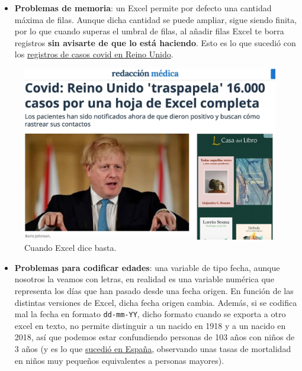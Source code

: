 \documentclass[11pt,]{book}
\providecommand{\tightlist}{%
  \setlength{\itemsep}{0pt}\setlength{\parskip}{0pt}}
\begin{document}
\begin{itemize}
\tightlist
\item
  \textbf{Problemas de memoria}: un Excel permite por defecto una cantidad máxima de filas. Aunque dicha cantidad se puede ampliar, sigue siendo finita, por lo que cuando superas el umbral de filas, al añadir filas Excel te borra registros \textbf{sin avisarte de que lo está haciendo}. Esto es lo que sucedió con los \href{https://www.redaccionmedica.com/secciones/sanidad-hoy/covid-reino-unido-pierden-16000-positivos-9989}{registros de casos covid en Reino Unido}.
\end{itemize}

\begin{figure}

{\centering \includegraphics[width=0.5\linewidth]{./img/excel_uk} 

}

\caption{Cuando Excel dice basta.}\label{fig:excel-uk}
\end{figure}

\begin{itemize}
\tightlist
\item
  \textbf{Problemas para codificar edades}: una variable de tipo fecha, aunque nosotros la veamos con letras, en realidad es una variable numérica que representa los días que han pasado desde una fecha origen. En función de las distintas versiones de Excel, dicha fecha origen cambia. Además, si se codifica mal la fecha en formato \texttt{dd-mm-YY}, dicho formato cuando se exporta a otro excel en texto, no permite distinguir a un nacido en 1918 y a un nacido en 2018, así que podemos estar confundiendo personas de 103 años con niños de 3 años (y es lo que \href{https://www.niusdiario.es/sociedad/sanidad/sanidad-reconoce-datos-muertes-ninos-covid-erroneos-contabilizaban-centenarios-como-menores_18_3107220241.html}{sucedió en España}, observando unas tasas de mortalidad en niños muy pequeños equivalentes a personas mayores).
\end{itemize}
\end{document}

